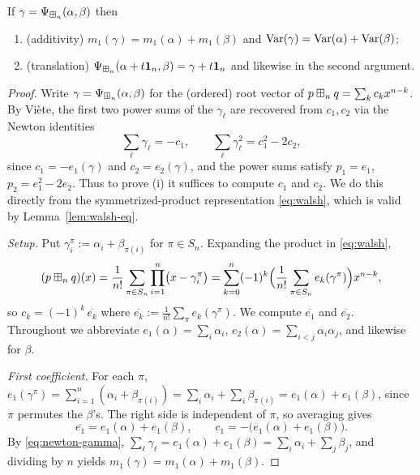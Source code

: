 \begin{qfourproposition}\label{prop:props}
If $\gamma=\Psi_{\boxplus_n}(\alpha,\beta)$ then
\begin{enumerate}\setlength\itemsep{2pt}
\item (additivity) $m_1(\gamma)=m_1(\alpha)+m_1(\beta)$ and
$\operatorname{Var}(\gamma)=\operatorname{Var}(\alpha)+\operatorname{Var}(\beta)$;
\item (translation) $\Psi_{\boxplus_n}(\alpha+t\mathbf 1_n,\beta)=\gamma+t\mathbf 1_n$
and likewise in the second argument.
\end{enumerate}
\end{qfourproposition}

\begin{proof}
Write $\gamma=\Psi_{\boxplus_n}(\alpha,\beta)$ for the (ordered) root vector of
$p\boxplus_n q=\sum_{k}c_kx^{n-k}$. By Vi\`ete, the first two power sums of the
$\gamma_\ell$ are recovered from $c_1,c_2$ via the Newton identities
\begin{equation}\label{eq:newton-gamma}
\sum_{\ell}\gamma_\ell=-c_1,\qquad
\sum_{\ell}\gamma_\ell^2=c_1^2-2c_2,
\end{equation}
since $c_1=-e_1(\gamma)$ and $c_2=e_2(\gamma)$, and the power sums satisfy
$p_1=e_1$, $p_2=e_1^2-2e_2$. Thus to prove (i) it suffices to compute $c_1$ and
$c_2$. We do this directly from the symmetrized-product representation
\eqref{eq:walsh}, which is valid by Lemma~\ref{lem:walsh-eq}.

\smallskip\noindent\emph{Setup.}
Put $\gamma_i^\pi:=\alpha_i+\beta_{\pi(i)}$ for $\pi\in S_n$. Expanding the
product in \eqref{eq:walsh},
\[
(p\boxplus_n q)(x)=\frac1{n!}\sum_{\pi\in S_n}\prod_{i=1}^n\bigl(x-\gamma_i^\pi\bigr)
=\sum_{k=0}^n(-1)^k\Bigl(\frac1{n!}\sum_{\pi\in S_n}e_k(\gamma^\pi)\Bigr)x^{n-k},
\]
so $c_k=(-1)^k\,\overline{e_k}$ where $\overline{e_k}:=\frac1{n!}\sum_{\pi}e_k(\gamma^\pi)$.
We compute $\overline{e_1}$ and $\overline{e_2}$. Throughout we abbreviate
$e_1(\alpha)=\sum_i\alpha_i$, $e_2(\alpha)=\sum_{i<j}\alpha_i\alpha_j$, and
likewise for $\beta$.

\smallskip\noindent\emph{First coefficient.}
For each $\pi$,
$e_1(\gamma^\pi)=\sum_{i=1}^n(\alpha_i+\beta_{\pi(i)})
=\sum_i\alpha_i+\sum_i\beta_{\pi(i)}=e_1(\alpha)+e_1(\beta)$,
since $\pi$ permutes the $\beta$'s. The right side is independent of $\pi$, so
averaging gives
\begin{equation}\label{eq:c1}
\overline{e_1}=e_1(\alpha)+e_1(\beta),\qquad
c_1=-\bigl(e_1(\alpha)+e_1(\beta)\bigr).
\end{equation}
By \eqref{eq:newton-gamma}, $\sum_\ell\gamma_\ell=e_1(\alpha)+e_1(\beta)=\sum_i\alpha_i+\sum_j\beta_j$,
and dividing by $n$ yields $m_1(\gamma)=m_1(\alpha)+m_1(\beta)$.


\end{proof}
